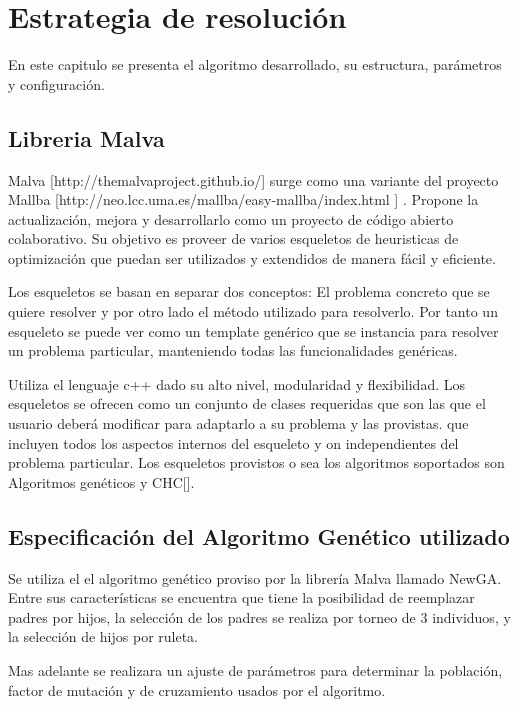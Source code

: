 \chapter{Estrategia de resolución}

En este capitulo se presenta el algoritmo desarrollado, su estructura, parámetros y configuración. 

\section{Libreria Malva}

Malva [http://themalvaproject.github.io/] surge como una variante del proyecto Mallba [http://neo.lcc.uma.es/mallba/easy-mallba/index.html ] . Propone la actualización, mejora y desarrollarlo como un proyecto de código abierto colaborativo.  Su objetivo es proveer de varios esqueletos de heuristicas de optimización que puedan ser utilizados y extendidos de manera fácil y eficiente.

Los esqueletos se basan en separar dos conceptos: El problema concreto que se quiere resolver y por otro lado el método utilizado para resolverlo. Por tanto un esqueleto se puede ver como un template genérico que se instancia para resolver un problema particular, manteniendo todas las funcionalidades genéricas.

Utiliza el lenguaje c++ dado su alto nivel, modularidad y flexibilidad. Los esqueletos se ofrecen como un conjunto de clases requeridas que son las que el usuario deberá modificar para adaptarlo a su problema y las provistas. que incluyen todos los aspectos internos del esqueleto y on independientes del problema particular.
Los esqueletos provistos o sea los algoritmos soportados son Algoritmos genéticos y CHC[].


\newpage

\section{Especificación del Algoritmo Genético utilizado}
Se utiliza el el algoritmo genético proviso por la librería  Malva  llamado NewGA.
Entre sus características se encuentra que tiene la posibilidad de reemplazar padres por hijos, la selección de los padres se realiza por torneo de 3 individuos, y la selección de hijos por ruleta.

Mas adelante se realizara un ajuste de parámetros para determinar la población, factor de mutación y de cruzamiento usados por el algoritmo.

